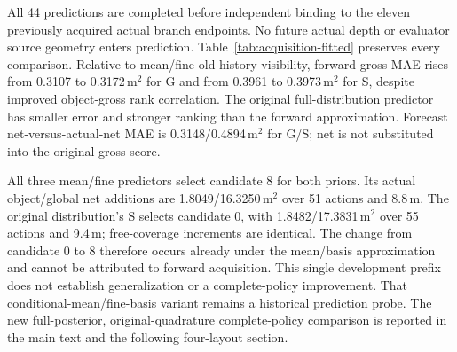 All 44 predictions are completed before independent binding to the eleven previously acquired actual branch endpoints. No future actual depth or evaluator source geometry enters prediction. Table~\ref{tab:acquisition-fitted} preserves every comparison. Relative to mean/fine old-history visibility, forward gross MAE rises from 0.3107 to 0.3172\,m$^2$ for G and from 0.3961 to 0.3973\,m$^2$ for S, despite improved object-gross rank correlation. The original full-distribution predictor has smaller error and stronger ranking than the forward approximation. Forecast net-versus-actual-net MAE is 0.3148/0.4894\,m$^2$ for G/S; net is not substituted into the original gross score.

All three mean/fine predictors select candidate 8 for both priors. Its actual object/global net additions are 1.8049/16.3250\,m$^2$ over 51 actions and 8.8\,m. The original distribution's S selects candidate 0, with 1.8482/17.3831\,m$^2$ over 55 actions and 9.4\,m; free-coverage increments are identical. The change from candidate 0 to 8 therefore occurs already under the mean/basis approximation and cannot be attributed to forward acquisition. This single development prefix does not establish generalization or a complete-policy improvement. That conditional-mean/fine-basis variant remains a historical prediction probe. The new full-posterior, original-quadrature complete-policy comparison is reported in the main text and the following four-layout section.

